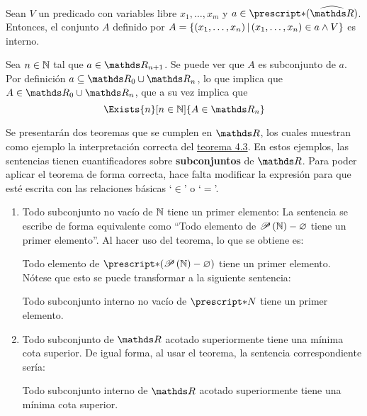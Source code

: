 \begin{theorem}
  Sean $V$ un predicado con variables libre $x_1,\dots,x_m$ y
  $a\in\st{(\Rh)}$. Entonces, el conjunto $A$ definido por
  $A=\left\{(x_1,\dots,x_n)\,\middle|\,(x_1,\dots,x_n)\in a \land V\right\}$ es interno.
\end{theorem}
\begin{demo}
  Sea $n\in\mathbb{N}$ tal que $a\in\R_{n+1}$. Se puede ver que $A$ es
  subconjunto de $a$. Por definición $a\subseteq \R_0 \cup \R_n$,
  lo que implica que $A\in\R_0\cup\R_n$, que a su vez implica que
  \[\Exists{n}[n\in\N]{A\in\R_n}\]
\end{demo}

Se presentarán dos teoremas que se cumplen en $\R$, los cuales muestran
como ejemplo la interpretación correcta del \hyperref[theo:FT]{teorema 4.3}.
En estos ejemplos, las sentencias tienen cuantificadores sobre
\textbf{subconjuntos} de $\R$. Para poder aplicar el teorema de forma
correcta, hace falta modificar la expresión para que esté escrita con
las relaciones básicas `$\in$' o `$=$'.

\begin{enumerate}
  \item Todo subconjunto no vacío de $\mathbb{N}$ tiene un primer elemento:
        La sentencia se escribe de forma equivalente como
        ``Todo elemento de $\mathscr{P}\left(\mathbb{N}\right) - \varnothing$ tiene un primer
        elemento''. Al hacer uso del teorema, lo que se obtiene es:

        Todo elemento de $\st{(\Pts{\N}-\varnothing)}$ tiene un primer
        elemento. Nótese que esto se puede transformar a la siguiente
        sentencia:

        Todo subconjunto interno no vacío de $\st{N}$ tiene un primer
        elemento.
  \item Todo subconjunto de $\R$ acotado superiormente tiene una mínima
        cota superior. De igual forma, al usar el teorema, la sentencia
        correspondiente sería:

        Todo subconjunto interno de $\R$ acotado superiormente tiene
        una mínima cota superior.
\end{enumerate}

